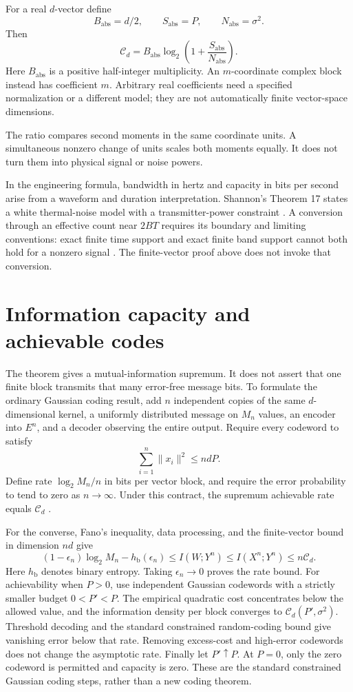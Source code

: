 \documentclass{article}
\begin{document}
For a real \(d\)-vector define
\[
B_{\mathrm{abs}}=d/2,\qquad S_{\mathrm{abs}}=P,
\qquad N_{\mathrm{abs}}=\sigma^2.
\]
Then
\[
\mathcal C_d=B_{\mathrm{abs}}
\log_2\!\left(1+\frac{S_{\mathrm{abs}}}{N_{\mathrm{abs}}}\right).
\]
Here \(B_{\mathrm{abs}}\) is a positive half-integer multiplicity. An \(m\)-coordinate complex block instead has coefficient \(m\). Arbitrary real coefficients need a specified normalization or a different model; they are not automatically finite vector-space dimensions.

The ratio compares second moments in the same coordinate units. A simultaneous nonzero change of units scales both moments equally. It does not turn them into physical signal or noise powers.

In the engineering formula, bandwidth in hertz and capacity in bits per second arise from a waveform and duration interpretation. Shannon's Theorem 17 states a white thermal-noise model with a transmitter-power constraint \cite{shannon}. A conversion through an effective count near \(2BT\) requires its boundary and limiting conventions: exact finite time support and exact finite band support cannot both hold for a nonzero signal \cite{polyanskiy19}. The finite-vector proof above does not invoke that conversion.

\section{Information capacity and achievable codes}
The theorem gives a mutual-information supremum. It does not assert that one finite block transmits that many error-free message bits. To formulate the ordinary Gaussian coding result, add \(n\) independent copies of the same \(d\)-dimensional kernel, a uniformly distributed message on \(M_n\) values, an encoder into \(E^n\), and a decoder observing the entire output. Require every codeword to satisfy
\[
\sum_{i=1}^n\|x_i\|^2\le ndP.
\]
Define rate \(\log_2M_n/n\) in bits per vector block, and require the error probability to tend to zero as \(n\to\infty\). Under this contract, the supremum achievable rate equals \(\mathcal C_d\) \cite{polyanskiy17}.

For the converse, Fano's inequality, data processing, and the finite-vector bound in dimension \(nd\) give
\[
(1-\epsilon_n)\log_2M_n-h_{\mathrm b}(\epsilon_n)
\le I(W;Y^n)
\le I(X^n;Y^n)
\le n\mathcal C_d.
\]
Here \(h_{\mathrm b}\) denotes binary entropy. Taking \(\epsilon_n\to0\) proves the rate bound. For achievability when \(P>0\), use independent Gaussian codewords with a strictly smaller budget \(0<P'<P\). The empirical quadratic cost concentrates below the allowed value, and the information density per block converges to \(\mathcal C_d(P',\sigma^2)\). Threshold decoding and the standard constrained random-coding bound give vanishing error below that rate. Removing excess-cost and high-error codewords does not change the asymptotic rate. Finally let \(P'\uparrow P\). At \(P=0\), only the zero codeword is permitted and capacity is zero. These are the standard constrained Gaussian coding steps, rather than a new coding theorem.
\end{document}
